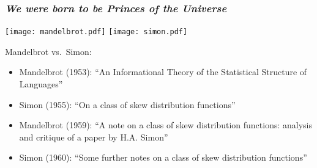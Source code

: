 


\begin{frame}
  \frametitle{\small\textit{We were born to be Princes of the Universe}}

  \smallskip

  \texttt{[image: mandelbrot.pdf]}
  \quad
  \texttt{[image: simon.pdf]}

  \begin{block}{Mandelbrot vs.\ Simon:}
    \begin{itemize}
    \item<2-> Mandelbrot (1953): ``An Informational Theory of the Statistical Structure of Languages''\cite{mandelbrot1953a}
    \item<3-> Simon (1955): ``On a class of skew distribution functions''\cite{simon1955a}
    \item<4-> Mandelbrot (1959):  ``A note on a class of skew distribution functions: analysis and critique of a paper by H.A. Simon''\cite{mandelbrot1959a}
    \item<5-> Simon (1960): ``Some further notes on a class of skew distribution functions''\cite{simon1960a}
    \end{itemize}
  \end{block}

\end{frame}

